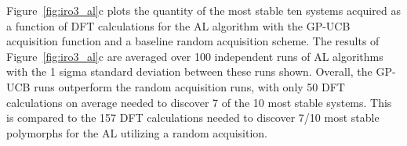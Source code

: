 %
Figure~\ref{fig:iro3_al}c plots the quantity of the most stable ten systems acquired as a function of DFT calculations for the AL algorithm with the GP-UCB acquisition function and a baseline random acquisition scheme.
%
The results of Figure~\ref{fig:iro3_al}c are averaged over 100 independent runs of AL algorithms with the 1 sigma standard deviation between these runs shown.
%
Overall, the GP-UCB runs outperform the random acquisition runs, with only \num{50} DFT calculations on average needed to discover \num{7} of the \num{10} most stable systems.
%
This is compared to the \num{157} DFT calculations needed to discover \num{7/10} most stable polymorphs for the AL utilizing a random acquisition.


